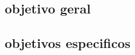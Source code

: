 \lipsum[1]

\subsection{objetivo geral}
\lipsum[1-4]

\subsection{objetivos especificos}
\lipsum[1-4]